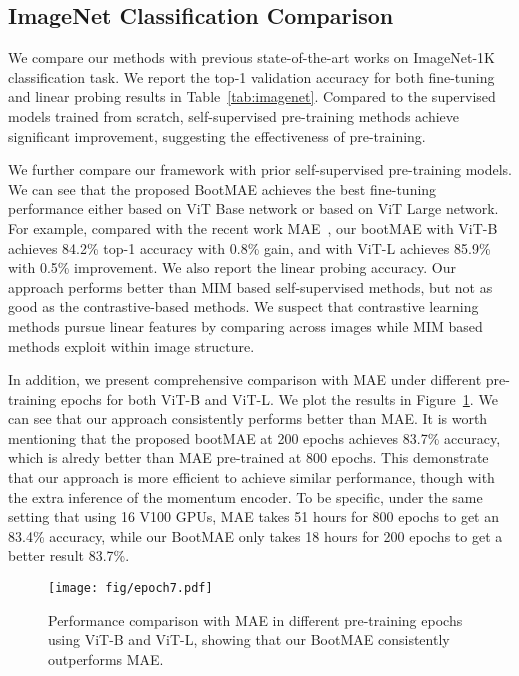 \documentclass[runningheads]{llncs}
\begin{document}
\vspace{-1mm}
\subsection{ImageNet Classification Comparison}
\vspace{-1mm}
We compare our methods with previous state-of-the-art works on ImageNet-1K classification task. We report the top-1 validation accuracy for both fine-tuning and linear probing results in Table~\ref{tab:imagenet}. Compared to the supervised models trained from scratch, self-supervised pre-training methods achieve significant improvement, suggesting the effectiveness of pre-training. 

We further compare our framework with prior self-supervised pre-training models. We can see that the proposed BootMAE achieves the best fine-tuning performance either based on ViT Base network or based on ViT Large network.
For example, compared with the recent work MAE~\cite{he2021masked}, our bootMAE with ViT-B achieves 84.2\% top-1 accuracy with 0.8\% gain, and with ViT-L achieves 85.9\% with 0.5\% improvement.
We also report the linear probing accuracy. Our approach performs better than MIM based self-supervised methods, but not as good as the contrastive-based methods.
We suspect that contrastive learning methods pursue linear features by comparing across images while MIM based methods exploit within image structure.
 

In addition, we present comprehensive comparison with MAE under different pre-training epochs for both ViT-B and ViT-L. We plot the results in Figure~\ref{fig:epoch}. We can see that our approach consistently performs better than MAE. It is worth mentioning that the proposed bootMAE at 200 epochs achieves 83.7\% accuracy, which is alredy better than MAE pre-trained at 800 epochs.
This demonstrate that our approach is more efficient to achieve similar performance, though with the extra inference of the momentum encoder.
To be specific, under the same setting that using 16 V100 GPUs, MAE takes 51 hours for 800 epochs to get an 83.4\% accuracy, 
while our BootMAE only takes 18 hours for 200 epochs to get a better result 83.7\%. 




\begin{figure}[t]\centering
\texttt{[image: fig/epoch7.pdf]}\vspace{-.7em}
\caption{Performance comparison with MAE in different pre-training epochs using ViT-B and ViT-L, showing that our BootMAE  consistently outperforms MAE.}
\label{fig:epoch}
\vspace{-4mm}
\end{figure}
\end{document}
